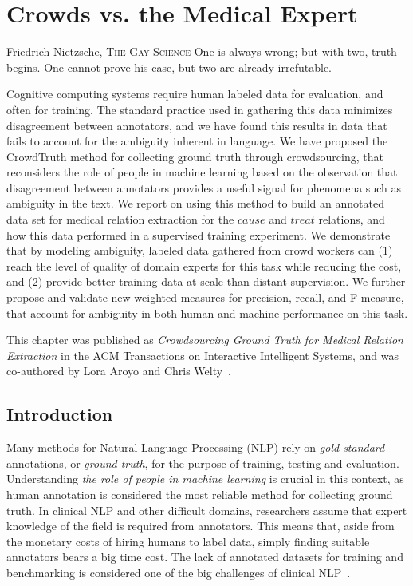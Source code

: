 \chapter{Crowds vs. the Medical Expert}
\label{chap:med-rel-ex}

\begin{chapquote}{Friedrich Nietzsche, \textsc{The Gay Science}}
One is always wrong; but with two, truth begins. One cannot prove his case, but two are already irrefutable.
\end{chapquote}

Cognitive computing systems require human labeled data for evaluation, and often for training. The standard practice used in gathering this data minimizes disagreement between annotators, and we have found this results in data that fails to account for the ambiguity inherent in language. We have proposed the CrowdTruth method for collecting ground truth through crowdsourcing, that reconsiders the role of people in machine learning based on the observation that disagreement between annotators provides a useful signal for phenomena such as ambiguity in the text. We report on using this method to build an annotated data set for medical relation extraction for the $cause$ and $treat$ relations, and how this data performed in a supervised training experiment. We demonstrate that by modeling ambiguity, labeled data gathered from crowd workers can (1) reach the level of quality of domain experts for this task while reducing the cost, and (2) provide better training data at scale than distant supervision. We further propose and validate new weighted measures for precision, recall, and F-measure, that account for ambiguity in both human and machine performance on this task.

This chapter was published as \textit{Crowdsourcing Ground Truth for Medical Relation Extraction} in the ACM Transactions on Interactive Intelligent Systems, and was co-authored by Lora Aroyo and Chris Welty~\cite{DBLP:journals/corr/DumitracheAW17}.


\section{Introduction}

Many methods for Natural Language Processing (NLP) rely on \textit{gold standard} annotations, or \textit{ground truth}, for the purpose of training, testing and evaluation.  Understanding \textit{the role of people in machine learning} is crucial in this context, as human annotation is considered the most reliable method for collecting ground truth.  In clinical NLP and other difficult domains, researchers assume that expert knowledge of the field is required from annotators.  This means that, aside from the monetary costs of hiring humans to label data, simply finding suitable annotators bears a big time cost. The lack of annotated datasets for training and benchmarking is considered one of the big challenges of clinical NLP~\cite{chapman2011overcoming}.

